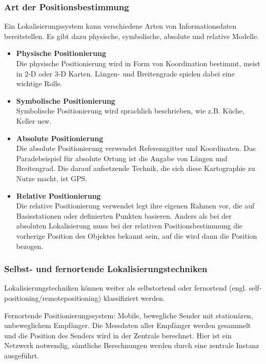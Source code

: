     \subsubsection{Art der Positionsbestimmung}

    Ein Lokalisierungssystem kann verschiedene Arten von Informationsdaten bereitstellen. Es gibt dazu physische, symbolische, absolute und relative Modelle. 

      \begin{itemize}
        \item \textbf{Physische Positionierung}\\
        Die physische Positionierung wird in Form von Koordination bestimmt, meist in 2-D oder 3-D Karten. Längen- und Breitengrade spielen dabei eine wichtige Rolle.
        \item \textbf{Symbolische Positionierung}\\
        Symbolische Positionierung wird sprachlich beschrieben, wie z.B.  Küche, Keller usw. 
        \item \textbf{Absolute Positionierung}\\
        Die absolute Positionierung verwendet Referenzgitter und Koordinaten. Das Paradebeispiel für absolute Ortung ist die Angabe von Längen­ und Breitengrad.   Die   darauf   aufsetzende   Technik, die   sich   diese   Kartographie   zu   Nutze macht, ist GPS. 
        \item \textbf{Relative Positionierung}\\
        Die relative Positionierung verwendet legt ihre eigenen Rahmen vor, die auf Basisstationen oder definierten Punkten basieren. Anders als bei der absoluten Lokalisierung muss bei der relativen Positionsbestimmung die vorherige Position des Objektes bekannt sein, auf die wird dann die Position bezogen. 
      \end{itemize}


    \subsubsection{Selbst- und fernortende Lokalisierungstechniken}

    Lokalisierungstechniken können weiter als selbstortend oder fernortend (engl. self­positioning/remote­positioning) klassifiziert werden.

Fernortende Positionierungssystem: Mobile, bewegliche Sender mit stationären, unbeweglichem Empfänger. Die Messdaten aller Empfänger werden gesammelt und die Position des Senders wird in der Zentrale berechnet. Hier ist ein Netzwerk notwendig, sämtliche Berechnungen werden durch eine zentrale Instanz ausgeführt.

